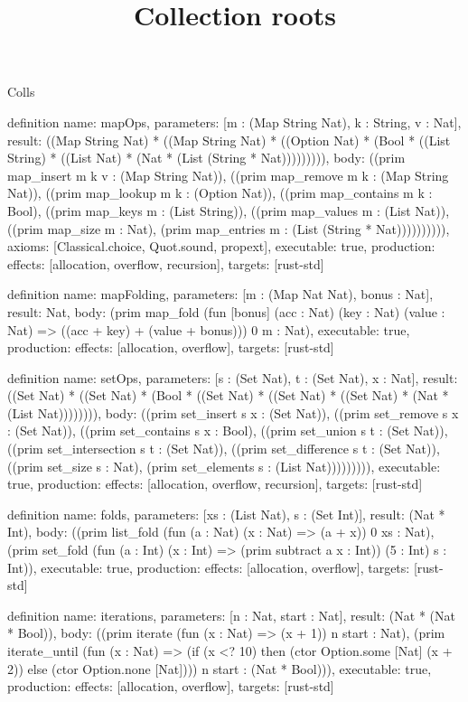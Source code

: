 \begin{lexlean}{Colls}
\title{Collection roots}
\begin{semanticmodule}
definition{
  name: mapOps,
  parameters: [m : (Map String Nat), k : String, v : Nat],
  result: ((Map String Nat) * ((Map String Nat) * ((Option Nat) * (Bool * ((List String) * ((List Nat) * (Nat * (List (String * Nat))))))))),
  body: ((prim map_insert m k v : (Map String Nat)), ((prim map_remove m k : (Map String Nat)), ((prim map_lookup m k : (Option Nat)), ((prim map_contains m k : Bool), ((prim map_keys m : (List String)), ((prim map_values m : (List Nat)), ((prim map_size m : Nat), (prim map_entries m : (List (String * Nat)))))))))),
  axioms: [Classical.choice, Quot.sound, propext],
  executable: true,
  production: {effects: [allocation, overflow, recursion], targets: [rust-std]}
}

definition{
  name: mapFolding,
  parameters: [m : (Map Nat Nat), bonus : Nat],
  result: Nat,
  body: (prim map_fold (fun [bonus] (acc : Nat) (key : Nat) (value : Nat) => ((acc + key) + (value + bonus))) 0 m : Nat),
  executable: true,
  production: {effects: [allocation, overflow], targets: [rust-std]}
}

definition{
  name: setOps,
  parameters: [s : (Set Nat), t : (Set Nat), x : Nat],
  result: ((Set Nat) * ((Set Nat) * (Bool * ((Set Nat) * ((Set Nat) * ((Set Nat) * (Nat * (List Nat)))))))),
  body: ((prim set_insert s x : (Set Nat)), ((prim set_remove s x : (Set Nat)), ((prim set_contains s x : Bool), ((prim set_union s t : (Set Nat)), ((prim set_intersection s t : (Set Nat)), ((prim set_difference s t : (Set Nat)), ((prim set_size s : Nat), (prim set_elements s : (List Nat))))))))),
  executable: true,
  production: {effects: [allocation, overflow, recursion], targets: [rust-std]}
}

definition{
  name: folds,
  parameters: [xs : (List Nat), s : (Set Int)],
  result: (Nat * Int),
  body: ((prim list_fold (fun (a : Nat) (x : Nat) => (a + x)) 0 xs : Nat), (prim set_fold (fun (a : Int) (x : Int) => (prim subtract a x : Int)) (5 : Int) s : Int)),
  executable: true,
  production: {effects: [allocation, overflow], targets: [rust-std]}
}

definition{
  name: iterations,
  parameters: [n : Nat, start : Nat],
  result: (Nat * (Nat * Bool)),
  body: ((prim iterate (fun (x : Nat) => (x + 1)) n start : Nat), (prim iterate_until (fun (x : Nat) => (if (x <? 10) then (ctor Option.some [Nat] (x + 2)) else (ctor Option.none [Nat]))) n start : (Nat * Bool))),
  executable: true,
  production: {effects: [allocation, overflow], targets: [rust-std]}
}


\end{semanticmodule}
\end{lexlean}
